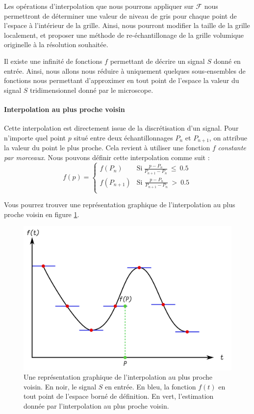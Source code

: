{{{		    Les opérations d'interpolation que nous pourrons appliquer sur $\mathcal{F}$ nous permettront de déterminer une valeur de niveau de gris pour chaque point de l'espace à l'intérieur de la grille. Ainsi, nous pourront modifier la taille de la grille localement, et proposer une méthode de re-échantillonage de la grille volumique originelle à la résolution souhaitée.

			Il existe une infinité de fonctions $f$ permettant de décrire un signal $S$ donné en entrée. Ainsi, nous allons nous réduire à uniquement quelques sous-ensembles de fonctions nous permettant d'approximer en tout point de l'espace la valeur du signal $S$ tridimensionnel donné par le microscope.

			\paragraph{Interpolation au plus proche voisin}
			{
				Cette interpolation est directement issue de la discrétisation d'un signal. Pour n'importe quel point $p$ situé entre deux échantillonnages $P_n$ et $P_{n+1}$, on attribue la valeur du point le plus proche. Cela revient à utiliser une fonction $f$ \emph{constante par morceaux}. Nous pouvons définir cette interpolation comme suit :
				\[f(p) = \left\{\begin{array}{ll} f(P_n) & \text{Si}~\frac{p-P_n}{P_{n+1}-P_n}~\leq~0.5 \\ f(P_{n+1}) & \text{Si }\frac{p-P_n}{P_{n+1}-P_n}~>~0.5 \\\end{array}\right.\]

				Vous pourrez trouver une représentation graphique de l'interpolation au plus proche voisin en figure \ref{img:interpolation_nn_with_point}.

				\begin{figure}[!h]
				    \centering
				    \includegraphics[width=.67\linewidth]{img/interpolation_nearest_with_point.png}
				    \captionsetup{width=.8\linewidth}
				    \caption{Une représentation graphique de l'interpolation au plus proche voisin. En noir, le signal $S$ en entrée. En bleu, la fonction $f(t)$ en tout point de l'espace borné de définition. En vert, l'estimation donnée par l'interpolation au plus proche voisin.}
				    \label{img:interpolation_nn_with_point}
				\end{figure}
				
}}}}
